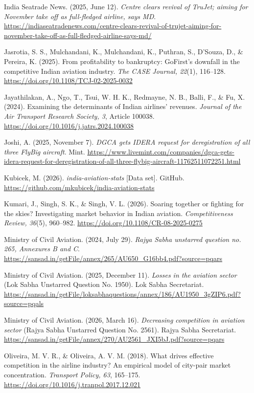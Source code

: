\documentclass[12pt,a4paper]{article}
\newenvironment{o3box}{\ifthenelse{\boolean{o3highlight}}{\begingroup\color{o3sky}}{}}{\ifthenelse{\boolean{o3highlight}}{\endgroup}{}}
\begin{document}
\begin{o3box}
India Seatrade News. (2025, June 12). \textit{Centre clears revival of TruJet; aiming for November take off as full-fledged airline, says MD}. \url{https://indiaseatradenews.com/centre-clears-revival-of-trujet-aiming-for-november-take-off-as-full-fledged-airline-says-md/}

Jasrotia, S. S., Mulchandani, K., Mulchandani, K., Puthran, S., D'Souza, D., \& Pereira, K. (2025). From profitability to bankruptcy: GoFirst's downfall in the competitive Indian aviation industry. \textit{The CASE Journal, 22}(1), 116--128. \url{https://doi.org/10.1108/TCJ-02-2025-0032}

Jayathilakan, A., Ngo, T., Tsui, W. H. K., Redmayne, N. B., Balli, F., \& Fu, X. (2024). Examining the determinants of Indian airlines' revenues. \textit{Journal of the Air Transport Research Society, 3}, Article 100038. \url{https://doi.org/10.1016/j.jatrs.2024.100038}

Joshi, A. (2025, November 7). \textit{DGCA gets IDERA request for deregistration of all three FlyBig aircraft}. Mint. \url{https://www.livemint.com/companies/dgca-gets-idera-request-for-deregistration-of-all-three-flybig-aircraft-11762511072251.html}

Kubicek, M. (2026). \textit{india-aviation-stats} [Data set]. GitHub. \url{https://github.com/mkubicek/india-aviation-stats}

Kumari, J., Singh, S. K., \& Singh, V. L. (2026). Soaring together or fighting for the skies? Investigating market behavior in Indian aviation. \textit{Competitiveness Review, 36}(5), 960--982. \url{https://doi.org/10.1108/CR-08-2025-0275}

Ministry of Civil Aviation. (2024, July 29). \textit{Rajya Sabha unstarred question no. 265, Annexures B and C}. \url{https://sansad.in/getFile/annex/265/AU650_G16bb4.pdf?source=pqars}

Ministry of Civil Aviation. (2025, December 11). \textit{Losses in the aviation sector} (Lok Sabha Unstarred Question No. 1950). Lok Sabha Secretariat. \url{https://sansad.in/getFile/loksabhaquestions/annex/186/AU1950_3gZIP6.pdf?source=pqals}

Ministry of Civil Aviation. (2026, March 16). \textit{Decreasing competition in aviation sector} (Rajya Sabha Unstarred Question No. 2561). Rajya Sabha Secretariat. \url{https://sansad.in/getFile/annex/270/AU2561_JXI5bJ.pdf?source=pqars}

Oliveira, M. V. R., \& Oliveira, A. V. M. (2018). What drives effective competition in the airline industry? An empirical model of city-pair market concentration. \textit{Transport Policy, 63}, 165--175. \url{https://doi.org/10.1016/j.tranpol.2017.12.021}


\end{o3box}
\end{document}
